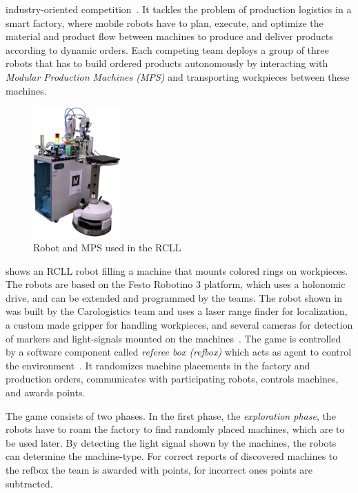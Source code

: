 industry-oriented competition~\cite{LLSF-Rules-2016}. It tackles the
problem of production logistics in a smart factory, where mobile
robots have to plan, execute, and optimize the material and product
flow between machines to produce and deliver products according to
dynamic orders. Each competing team deploys a group of three robots
that has to build ordered products autonomously by interacting with
\emph{Modular Production Machines (MPS)} and transporting workpieces
between these machines.
\begin{figure}
  \centering
  \vspace{-2.7ex}
  \includegraphics[width=0.3\textwidth]{img/rcll}
  \vspace{-4ex}
  \caption[Robot and MPS used in the RCLL]{Robot and MPS used in the RCLL~\cite{chapter-cps}}
  \label{fig:rcll-bot-mps}
\end{figure}
 shows an RCLL robot filling a machine that mounts
colored rings on workpieces. The robots are based on the Festo
Robotino 3 platform, which uses a holonomic drive, and can be extended
and programmed by the teams. The robot shown in  was
built by the Carologistics team and uses a laser range finder for
localization, a custom made gripper for handling workpieces, and
several cameras for detection of markers and light-signals mounted on
the machines~\cite{Carologistics2015,chapter-cps}. The game is
controlled by a software component called \emph{referee box (refbox)}
which acts as agent to control the environment~\cite{RCLL-Planning}.
It randomizes machine placements in the factory and
production orders, communicates with participating robots, controls
machines, and awards points.

The game consists of two phases. In the first phase, the
\emph{exploration phase}, the robots have to roam the factory to find
randomly placed machines, which are to be used later. By detecting the
light signal shown by the machines, the robots can determine the
machine-type. For correct reports of discovered machines to the refbox
the team is awarded with points, for incorrect ones points are subtracted.

